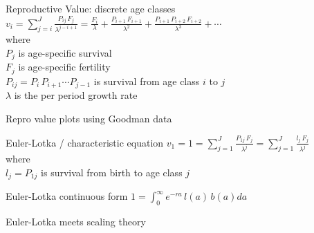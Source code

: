 \documentclass{beamer}
\begin{document}
\begin{frame}{Reproductive Value: discrete age classes}
  $v_i =  \displaystyle\sum\limits_{j=i}^{J} \frac{P_{ij} \, F_j}{\lambda^{j-i+1}} = \frac{F_i}{\lambda} + \frac{P_{i+1} \, F_{i+1}}{\lambda^2} + \frac{P_{i+1} \, P_{i+2} \, F_{i+2}}{\lambda^3} + \cdots$\\
  \vspace{.5cm}
  where\\
  \vspace{.5cm}
  $P_j$ is age-specific survival\\
  \vspace{.5cm}
  $F_j$ is age-specific fertility\\
  \vspace{.5cm}
  $P_{ij} = P_i \, P_{i+1} \cdots P_{j-1}$ is survival from age class $i$ to $j$\\
  \vspace{.5cm}
  $\lambda$ is the per period growth rate\\
\end{frame}

\begin{frame}{Repro value plots using Goodman data}
\end{frame}

\begin{frame}{Euler-Lotka / characteristic equation}
  $v_1 = 1 = \displaystyle\sum\limits_{j=1}^{J} \frac{P_{1j} \, F_j}{\lambda^j} = \displaystyle\sum\limits_{j=1}^{J} \frac{l_j \, F_j}{\lambda^j}$\\
\vspace{.5cm}
where\\
\vspace{.5cm}
  $l_j = P_{1j}$ is survival from birth to age class $j$\\
\end{frame}

\begin{frame}{Euler-Lotka continuous form}
  $1 = \int_{0}^{\infty} e^{-ra} \, l(a) \, b(a) da$\\
\end{frame}

\begin{frame}{Euler-Lotka meets scaling theory}
\end{frame}
\end{document}
